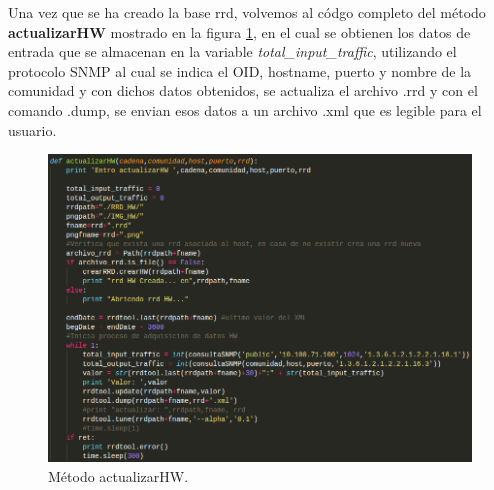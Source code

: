 \newpage
Una vez que se ha creado la base rrd, volvemos al códgo completo del método \textbf{actualizarHW} mostrado en la figura \ref{image:codigo3}, en el cual se obtienen los datos de entrada que se almacenan en la variable \textit{total\_input\_traffic}, utilizando el protocolo SNMP al  cual se indica el OID, hostname, puerto y nombre de la comunidad y con dichos datos obtenidos, se actualiza el archivo .rrd y con el comando .dump, se envian esos datos a un archivo .xml que es legible para el usuario.
\FloatBarrier
\begin{figure}[htbp!]
		\centering
			\includegraphics[width=1 \textwidth]{images/codigo3}
		\caption{Método actualizarHW.}
		\label{image:codigo3}
\end{figure}
\FloatBarrier

